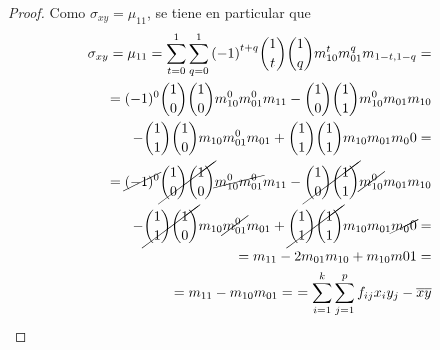 \documentclass[a4paper , 11pt, spanish ]{article}
\theoremstyle{definition}
\begin{document}
\begin{proof}
Como $\sigma_{xy} = \mu_{11}$, se tiene en particular que
\begin{align*}
\sigma_{xy} = \mu_{11} = \sum_{t=0}^1 \sum _{q=0}^1
    {(-1)}^{t+q} \binom{1}{t} \binom{1}{q} m_{10}^t m_{01}^q m_{1-t,1-q} = \\
= (-1)^0 \binom{1}{0} \binom{1}{0} m_{10}^0 m_{01}^0 m_{11}
  - \binom{1}{0} \binom{1}{1} m_{10}^0 m_{01}m_{10}  \\
  - \binom{1}{1} \binom{1}{0} m_{10}m_{01}^0 m_{01}
  + \binom{1}{1} \binom{1}{1} m_{10}m_{01}{m_00} = \\
= \cancel{(-1)^0} \cancel{\binom{1}{0}\binom{1}{0}} \cancel{m_{10}^0 m_{01}^0}
  m_{11}
  - \cancel{\binom{1}{0}\binom{1}{1}}\cancel{m_{10}^0} m_{01}m_{10} \\
  - \cancel{\binom{1}{1} \binom{1}{0}} m_{10}\cancel{m_{01}^0} m_{01}
   + \cancel{\binom{1}{1} \binom{1}{1}} m_{10}m_{01}\cancel{m_00} = \\
   = m_{11} - 2m_{01}m_{10} + m_{10}m{01} = \\
   = m_{11} - m_{10}m_{01} = \
   =  \sum_{i=1}^k \sum_{j=1}^p f_{ij} x_i y_j - \overline{x}\overline{y}
\end{align*}
\end{proof}
\end{document}
